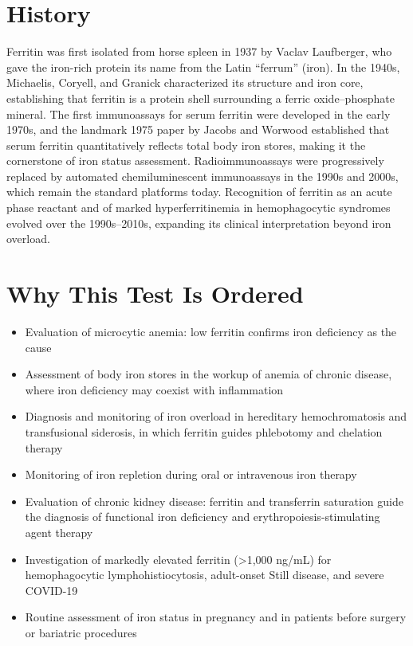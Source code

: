 \section*{History}
Ferritin was first isolated from horse spleen in 1937 by Vaclav Laufberger, who gave the iron-rich protein its name from the Latin ``ferrum'' (iron). In the 1940s, Michaelis, Coryell, and Granick characterized its structure and iron core, establishing that ferritin is a protein shell surrounding a ferric oxide--phosphate mineral. The first immunoassays for serum ferritin were developed in the early 1970s, and the landmark 1975 paper by Jacobs and Worwood established that serum ferritin quantitatively reflects total body iron stores, making it the cornerstone of iron status assessment. Radioimmunoassays were progressively replaced by automated chemiluminescent immunoassays in the 1990s and 2000s, which remain the standard platforms today. Recognition of ferritin as an acute phase reactant and of marked hyperferritinemia in hemophagocytic syndromes evolved over the 1990s--2010s, expanding its clinical interpretation beyond iron overload.
\section*{Why This Test Is Ordered}
\begin{itemize}
  \item Evaluation of microcytic anemia: low ferritin confirms iron deficiency as the cause
  \item Assessment of body iron stores in the workup of anemia of chronic disease, where iron deficiency may coexist with inflammation
  \item Diagnosis and monitoring of iron overload in hereditary hemochromatosis and transfusional siderosis, in which ferritin guides phlebotomy and chelation therapy
  \item Monitoring of iron repletion during oral or intravenous iron therapy
  \item Evaluation of chronic kidney disease: ferritin and transferrin saturation guide the diagnosis of functional iron deficiency and erythropoiesis-stimulating agent therapy
  \item Investigation of markedly elevated ferritin (>1,000 ng/mL) for hemophagocytic lymphohistiocytosis, adult-onset Still disease, and severe COVID-19
  \item Routine assessment of iron status in pregnancy and in patients before surgery or bariatric procedures
\end{itemize}
